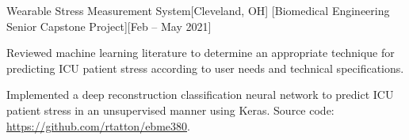 \begin{ritemize}
{Wearable Stress Measurement System}[Cleveland, OH]
[Biomedical Engineering Senior Capstone Project][Feb -- May 2021]
	\item Reviewed machine learning literature to determine an appropriate technique for predicting ICU patient stress according to user needs and technical specifications.
	\item Implemented a deep reconstruction classification neural network to predict ICU patient stress in an unsupervised manner using Keras. Source code: \url{https://github.com/rtatton/ebme380}.
\end{ritemize}